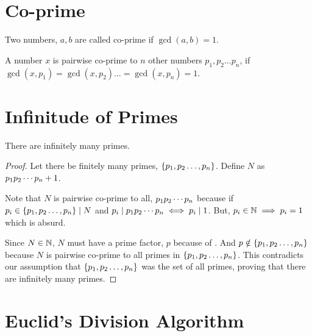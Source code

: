 \section{Co-prime}

\begin{definition}
    Two numbers, \(a, b\) are called co-prime if \(\gcd(a,b)=1\).
\end{definition}

\begin{definition}
    A number \(x\) is pairwise co-prime to \(n\) other numbers \(p_{1}, p_{2} \ldots p_{n}\), if \( \gcd(x, p_1) = \gcd(x, p_2) \ldots = \gcd(x, p_n) =1 \).
\end{definition}

\section{Infinitude of Primes}



\begin{theorem}
    [Euclid]
    There are infinitely many primes.
\end{theorem}

\begin{proof}
    Let there be finitely many primes, \(\{p_{1},p_{2}\ldots,p_{n}\}\). Define \( N \) as \( p_{1}p_{2}\cdots p_{n} + 1 \).
    \par
    Note that \(N\) is pairwise co-prime to all, \(p_{1}p_{2}\cdots p_{n}\) because if \(p_i \in \{p_{1},p_{2}\ldots,p_{n}\} \mid N \) 
    and \(p_i \mid p_{1}p_{2}\cdots p_{n} \iff p_i \mid 1\). But, \( p_i \in \mathbb N \implies p_i = 1 \) which is absurd.
    \\
    \par Since \(N \in \mathbb N\), \(N\) must have a prime factor, \(p\) because of . 
    And \(p \notin \{p_{1},p_{2}\ldots,p_{n}\}\) because \(N \) is pairwise co-prime to all primes in \(\{p_{1},p_{2}\ldots,p_{n}\}\). 
    This contradicts our assumption that \(\{p_{1},p_{2}\ldots,p_{n}\}\) was the set of all primes, 
    proving that there are infinitely many primes.

\end{proof}

\section{Euclid's Division Algorithm}

